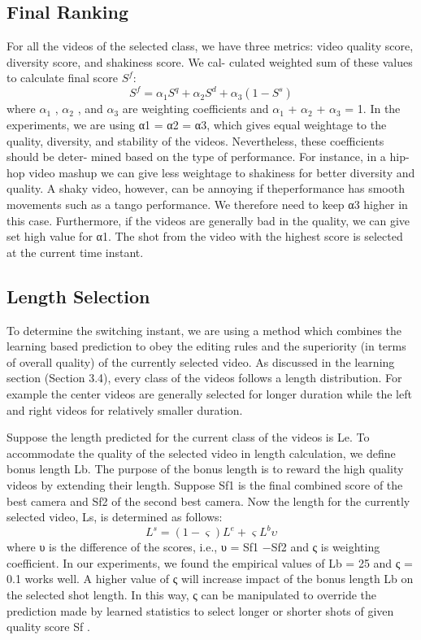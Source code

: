 \documentclass{sig-alternate}
\begin{document}
\subsection{Final Ranking}
For all the videos of the selected class, we have three metrics:
video quality score, diversity score, and shakiness score. We cal-
culated weighted sum of these values to calculate final score \(S^f\):
\begin{equation}
S^f = \alpha_1 S^q + \alpha_2 S^d + \alpha_3 (1-S^s)
\end{equation}
where $\alpha_1$ , $\alpha_2$ , and $\alpha_3$ are weighting coefficients and $\alpha_1$ + $\alpha_2$ + $\alpha_3$ = 1. In the experiments, we are using α1 = α2 = α3, which gives equal weightage to the quality, diversity, and stability of the videos. Nevertheless, these coefficients should be deter-
mined based on the type of performance. For instance, in a hip-hop
video mashup we can give less weightage to shakiness for better diversity and quality. A shaky video, however, can be annoying if theperformance has smooth movements such as a tango performance.
We therefore need to keep α3 higher in this case. Furthermore, if
the videos are generally bad in the quality, we can give set high
value for α1. The shot from the video with the highest score is
selected at the current time instant.

\subsection{Length Selection}
To determine the switching instant, we are using a method which
combines the learning based prediction to obey the editing rules and
the superiority (in terms of overall quality) of the currently selected
video. As discussed in the learning section (Section 3.4), every
class of the videos follows a length distribution. For example the
center videos are generally selected for longer duration while the
left and right videos for relatively smaller duration.

Suppose the length predicted for the current class of the videos
is Le. To accommodate the quality of the selected video in length
calculation, we define bonus length Lb. The purpose of the bonus
length is to reward the high quality videos by extending their length.
Suppose Sf1 is the final combined score of the best camera and Sf2
of the second best camera. Now the length for the currently selected
video, Ls, is determined as follows:
\begin{equation}
L^s = (1-\varsigma)L^e+\varsigma L^b\upsilon
\end{equation}
where υ is the difference of the scores, i.e., υ = Sf1 −Sf2 and ς is
weighting coefficient. In our experiments, we found the empirical
values of Lb = 25 and ς = 0.1 works well. A higher value of
ς will increase impact of the bonus length Lb on the selected shot
length. In this way, ς can be manipulated to override the prediction
made by learned statistics to select longer or shorter shots of given
quality score Sf .
\end{document}
